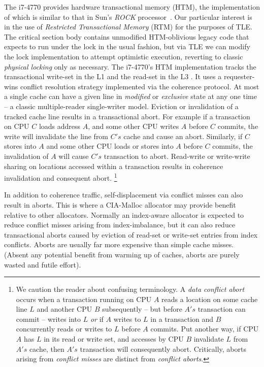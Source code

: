 \documentclass[preprint]{sigplanconf}
\begin{document}
The i7-4770 provides hardware transactional memory (HTM), the implementation
of which is similar to that in Sun's \emph{ROCK} processor~\cite{asplos09-dice}.
Our particular interest
is in the use of \emph{Restricted Transactional Memory} (RTM) for the purposes of
TLE.  The critical section body contains unmodified HTM-oblivious legacy code 
that expects to run under the lock in the usual fashion, but via TLE we can 
modify the lock implementation to attempt optimistic execution, reverting to classic
\emph{physical locking} only as necessary. The i7-4770's HTM implementation tracks the 
transactional write-set in the L1 and the read-set in the L3 . It uses a 
requester-wins conflict resolution strategy implemented via the coherence protocol. 
At most a single cache can have a given line in \emph{modified} or \emph{exclusive} 
state at any one time -- a classic multiple-reader single-writer model. Eviction 
or invalidation of a tracked cache line results in a transactional abort.  
For example if a transaction on CPU $C$ loads address $A$, and some other CPU writes 
$A$ before $C$ commits, the write will invalidate the line from $C's$ cache and cause 
an abort. Similarly, if $C$ stores into $A$ and some other CPU loads or stores 
into $A$ before $C$ commits, the invalidation of $A$ will cause $C's$ transaction to 
abort. Read-write or write-write sharing on locations accessed within a 
transaction results in coherence invalidation and consequent abort. 
\footnote{We caution the reader about confusing terminology.  A \emph{data conflict
abort} occurs when a transaction running on CPU $A$ reads a location on some cache 
line $L$ and another CPU $B$ subsequently -- but before $A's$ transaction
can commit -- writes into $L$ \emph{or} if $A$ writes to $L$ in a transaction and $B$ 
concurrently reads or writes to $L$ before $A$ commits.  Put another way,
if CPU $A$ has $L$ in its read or write set, and accesses by CPU $B$ invalidate
$L$ from $A's$ cache, then $A's$ transaction will consequently abort.
Critically, aborts arising from \emph{conflict misses} are distinct 
from \emph{conflict aborts}.} 

In addition to coherence traffic, self-displacement via conflict misses can 
also result in aborts. This is where a CIA-Malloc allocator may provide benefit 
relative to other allocators. Normally an index-aware allocator is expected to 
reduce conflict misses arising from index-imbalance, but it can also reduce 
transactional aborts caused by eviction of read-set or write-set entries from 
index conflicts. Aborts are usually far more expensive than simple cache misses. 
(Absent any potential benefit from warming up of caches, aborts are purely wasted 
and futile effort).
\end{document}
